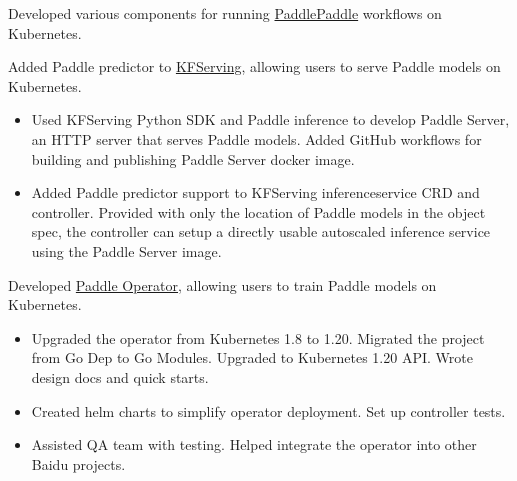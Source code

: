 
Developed various components for running \href{https://github.com/PaddlePaddle}{PaddlePaddle} workflows on Kubernetes.

\begin{miniItemize}
    \item Added Paddle predictor to \href{https://github.com/kubeflow/kfserving}{KFServing}, allowing users to serve Paddle models on Kubernetes.
    \begin{itemize}[after=\vspace{0ex}]
        \item Used KFServing Python SDK and Paddle inference to develop Paddle Server, an HTTP server that serves Paddle models. Added GitHub workflows for building and publishing Paddle Server docker image.
        \item Added Paddle predictor support to KFServing inferenceservice CRD and controller. Provided with only the location of Paddle models in the object spec, the controller can setup a directly usable autoscaled inference service using the Paddle Server image.
    \end{itemize}
    \item Developed \href{https://github.com/PaddleFlow/paddle-operator}{Paddle Operator}, allowing users to train Paddle models on Kubernetes.
    \begin{itemize}[after=\vspace{0ex}]
        \item Upgraded the operator from Kubernetes 1.8 to 1.20. Migrated the project from Go Dep to Go Modules. Upgraded to Kubernetes 1.20 API. Wrote design docs and quick starts.
        \item Created helm charts to simplify operator deployment. Set up controller tests.
        \item Assisted QA team with testing. Helped integrate the operator into other Baidu projects.
    \end{itemize}
\end{miniItemize}
